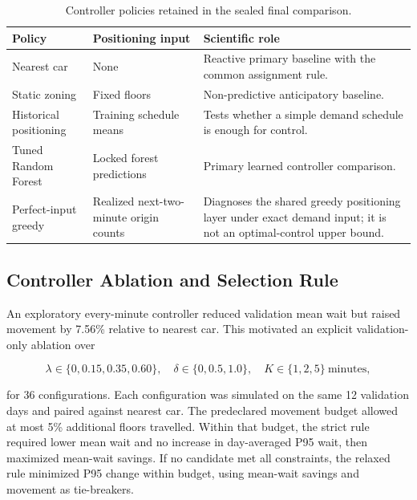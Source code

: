 \documentclass[12pt]{article}
\begin{document}
\begin{table}[H]
  \centering
  \caption{Controller policies retained in the sealed final comparison.}
  \label{tab:final-controller-policies}
  \begin{tabular}{@{}>{\raggedright\arraybackslash}p{}
    >{\raggedright\arraybackslash}p{}
    >{\raggedright\arraybackslash}p{}@{}}
    \toprule
    Policy & Positioning input & Scientific role \\
    \midrule
    Nearest car & None & Reactive primary baseline with the common assignment
      rule. \\
    Static zoning & Fixed floors & Non-predictive anticipatory baseline. \\
    Historical positioning & Training schedule means & Tests whether a simple
      demand schedule is enough for control. \\
    Tuned Random Forest & Locked forest predictions & Primary learned
      controller comparison. \\
    Perfect-input greedy & Realized next-two-minute origin counts & Diagnoses
      the shared greedy positioning layer under exact demand input; it is not
      an optimal-control upper bound. \\
    \bottomrule
  \end{tabular}
\end{table}

\subsection{Controller Ablation and Selection Rule}

An exploratory every-minute controller reduced validation mean wait but raised
movement by 7.56\% relative to nearest car. This motivated an explicit
validation-only ablation over

\begin{equation}
  \lambda\in\{0,0.15,0.35,0.60\},\quad
  \delta\in\{0,0.5,1.0\},\quad
  K\in\{1,2,5\}\ \text{minutes},
  \label{eq:controller-grid}
\end{equation}

for 36 configurations. Each configuration was simulated on the same 12
validation days and paired against nearest car. The predeclared movement budget
allowed at most 5\% additional floors travelled. Within that budget, the strict
rule required lower mean wait and no increase in day-averaged P95 wait, then
maximized mean-wait savings. If no candidate met all constraints, the relaxed
rule minimized P95 change within budget, using mean-wait savings and movement
as tie-breakers.
\end{document}

